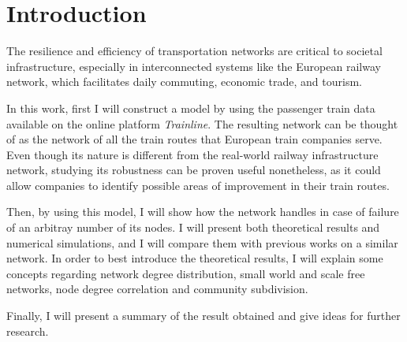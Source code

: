\section{Introduction}
The resilience and efficiency of transportation networks are critical to societal infrastructure, especially in interconnected systems like the European railway network, which facilitates daily commuting, economic trade, and tourism.

In this work, first I will construct a model by using the passenger train data available on the online platform \emph{Trainline}. The resulting network can be thought of as the network of all the train routes that European train companies serve. Even though its nature is different from the real-world railway infrastructure network, studying its robustness can be proven useful nonetheless, as it could allow companies to identify possible areas of improvement in their train routes.

Then, by using this model, I will show how the network handles in case of failure of an arbitray number of its nodes. I will present both theoretical results and numerical simulations, and I will compare them with previous works on a similar network. In order to best introduce the theoretical results, I will 
explain some concepts regarding network degree distribution, small world and scale free networks, node degree correlation and community subdivision.

Finally, I will present a summary of the result obtained and give ideas for further research.
